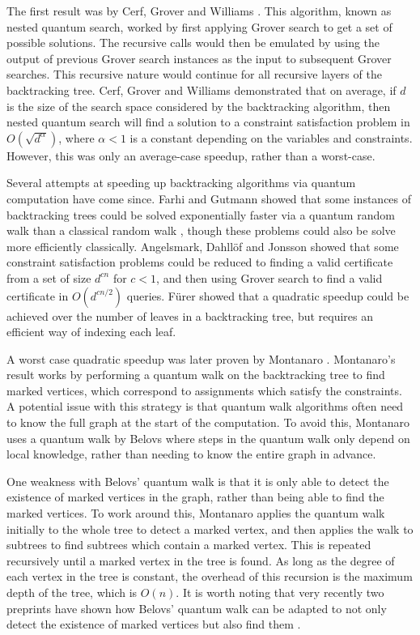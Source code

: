 The first result was by Cerf, Grover and Williams \cite{cerf2000}. This algorithm, known as nested quantum search, worked by first applying Grover search to get a set of possible solutions. The recursive calls would then be emulated by using the output of previous Grover search instances as the input to subsequent Grover searches. This recursive nature would continue for all recursive layers of the backtracking tree. Cerf, Grover and Williams demonstrated that on average, if $d$ is the size of the search space considered by the backtracking algorithm, then nested quantum search will find a solution to a constraint satisfaction problem in $O(\sqrt{d^\alpha})$, where $\alpha<1$ is a constant depending on the variables and constraints. However, this was only an average-case speedup, rather than a worst-case.

Several attempts at speeding up backtracking algorithms via quantum computation have come since. Farhi and Gutmann \cite{farhi1998} showed that some instances of backtracking trees could be solved exponentially faster via a quantum random walk than a classical random walk \cite{farhi1998}, though these problems could also be solve more efficiently classically. Angelsmark, Dahll{\"o}f and Jonsson showed that some constraint satisfaction problems could be reduced to finding a valid certificate from a set of size $d^{cn}$ for $c<1$, and then using Grover search to find a valid certificate in $O(d^{cn/2})$ queries. F\"{u}rer \cite{furer2008} showed that a quadratic speedup could be achieved over the number of leaves in a backtracking tree, but requires an efficient way of indexing each leaf.

A worst case quadratic speedup was later proven by Montanaro \cite{montanaro2015}. Montanaro's result works by performing a quantum walk on the backtracking tree to find marked vertices, which correspond to assignments which satisfy the constraints. A potential issue with this strategy is that quantum walk algorithms often need to know the full graph at the start of the computation. To avoid this, Montanaro uses a quantum walk by Belovs \cite{belovs2013,belovs13a} where steps in the quantum walk only depend on local knowledge, rather than needing to know the entire graph in advance.

One weakness with Belovs' quantum walk is that it is only able to detect the existence of marked vertices in the graph, rather than being able to find the marked vertices. To work around this, Montanaro applies the quantum walk initially to the whole tree to detect a marked vertex, and then applies the walk to subtrees to find subtrees which contain a marked vertex. This is repeated recursively until a marked vertex in the tree is found. As long as the degree of each vertex in the tree is constant, the overhead of this recursion is the maximum depth of the tree, which is $O(n)$. It is worth noting that very recently two preprints have shown how Belovs' quantum walk can be adapted to not only detect the existence of marked vertices but also find them \cite{apers2019, piddock2019}.

